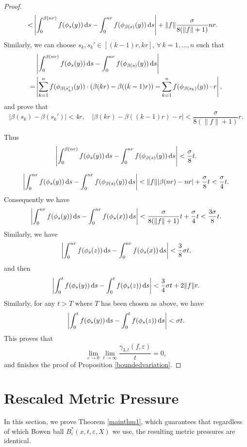 \documentclass[10pt]{article}
\newtheorem*{Theorem A}{Theorem A}
\begin{document}
\begin{proof}
\begin{align*}
< &\left| \int_0^{\beta(nr)} f(\phi_s(y)) \, {\rm d}s - \int_0^{nr} f(\phi_{\beta(s)}(y)) \, {\rm d}s \right| + \| f \|  \frac{\sigma}{8(\| f \| + 1)} nr.
\end{align*}
Similarly, we can choose \( s_k, s_k' \in [(k-1)r, kr] \), \(\forall \,k = 1, \dots, n \) such that
\begin{align*}
  &\left| \int_0^{\beta(nr)} f(\phi_s(y)) \, {\rm d}s - \int_0^{nr} f(\phi_{\beta(s)}(y)) \, {\rm d}s \right| \\
= &\left| \sum_{k=1}^n  f(\phi_{\beta(s'_{k})}(y))\cdot (\beta(kr)-\beta((k-1)r))-\sum_{k=1}^n f(\phi_{\beta(s_k)}(y))\cdot r \right|,
\end{align*}
and prove that
\[
|\beta{(s_k)} - \beta{(s_k')}| < 4r, \quad \left| \beta(kr) - \beta((k-1)r) - r \right| < \frac{\sigma}{8(\| f \| + 1)} r.
\]

\noindent
Thus
\[
\left| \int_0^{\beta(nr)} f(\phi_s(y)) \, {\rm d}s - \int_0^{nr} f(\phi_{\beta(s)}(y)) \, {\rm d}s \right| < \frac{\sigma}{8} t.
\]

\noindent
{}
\[
\left| \int_0^{nr} f(\phi_s(y)) \, {\rm d}s - \int_0^{nr} f(\phi_{\beta(s)}(y)) \, {\rm d}s \right| <\|f\||\beta(nr)-nr|+ \frac{\sigma}{8} t<\frac{\sigma}{4}t.
\]
Consequently we have
\[
\left| \int_0^{nr} f(\phi_s(y)) \, {\rm d}s - \int_0^{nr} f(\phi_s(x)) \, {\rm d}s \right| < \frac{\sigma}{8(\| f \| + 1)} t + \frac{\sigma}{4} t < \frac{3\sigma}{8} t.
\]
Similarly, we have
\[
\left| \int_0^{nr} f(\phi_s(z)) \, {\rm d}s - \int_0^{nr} f(\phi_s(x)) \, {\rm d}s \right| < \frac{3}{8} \sigma t,
\]
and then
\[
\left| \int_0^{t} f(\phi_s(y)) \, {\rm d}s - \int_0^t f(\phi_s(z)) \, {\rm d}s \right| < \frac{3}{4} \sigma t + 2 \| f \| r.
\]
Similarly, for any $t > T$  where $T$ has been chosen as above, we have
\[\left| \int_0^t f(\phi_s(y)) \, {\rm d}s - \int_0^t f(\phi_s(z)) \, {\rm d}s \right| < \sigma t. \]
This proves that
\[
\lim\limits_{\varepsilon \to 0} \lim_{t \to \infty} \frac{\gamma_{3,t}(f,\varepsilon)}{t} = 0,
\]
and finishes the proof of Proposition \ref{boundedvariation}.
\end{proof}


\section{Rescaled Metric Pressure}\label{sec:pressure}
In this section, we prove Theorem \ref{mainthm1}, which guarantees that regardless of which Bowen ball $B_i^*(x, t, \varepsilon, X)$ we use, the resulting metric pressures are identical.
\end{document}
